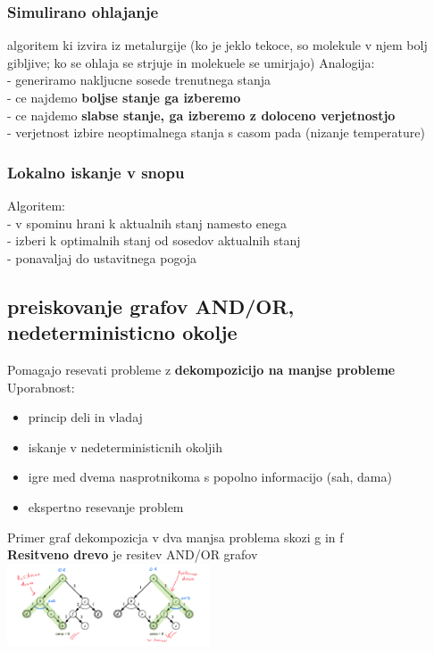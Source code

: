 \subsubsection{Simulirano ohlajanje}
algoritem ki izvira iz metalurgije (ko je jeklo tekoce, so molekule v njem bolj gibljive; ko se ohlaja se strjuje in molekuele se umirjajo)
Analogija:\\
- generiramo nakljucne sosede trenutnega stanja\\
- ce najdemo \textbf{boljse stanje ga izberemo}\\
- ce najdemo \textbf{slabse stanje, ga izberemo z doloceno verjetnostjo}\\
- verjetnost izbire neoptimalnega stanja s casom pada (nizanje temperature)

\subsubsection{Lokalno iskanje v snopu}
Algoritem:\\
- v spominu hrani k aktualnih stanj namesto enega\\
- izberi k optimalnih stanj od sosedov aktualnih stanj\\
- ponavaljaj do ustavitnega pogoja 

\subsection{preiskovanje grafov AND/OR, nedeterministicno okolje}
Pomagajo resevati probleme z \textbf{dekompozicijo na manjse probleme}
Uporabnost:
\begin{itemize}[noitemsep,topsep=0pt,leftmargin=*]
    \item princip deli in vladaj
    \item iskanje v nedeterministicnih okoljih 
    \item igre med dvema nasprotnikoma s popolno informacijo (sah, dama)
    \item ekspertno resevanje problem
\end{itemize}
Primer graf dekompozicja v dva manjsa problema skozi g in f\\
\textbf{Resitveno drevo} je resitev AND/OR grafov\\
\includegraphics[width=6cm]{./images/resitveno-drevo.png}
